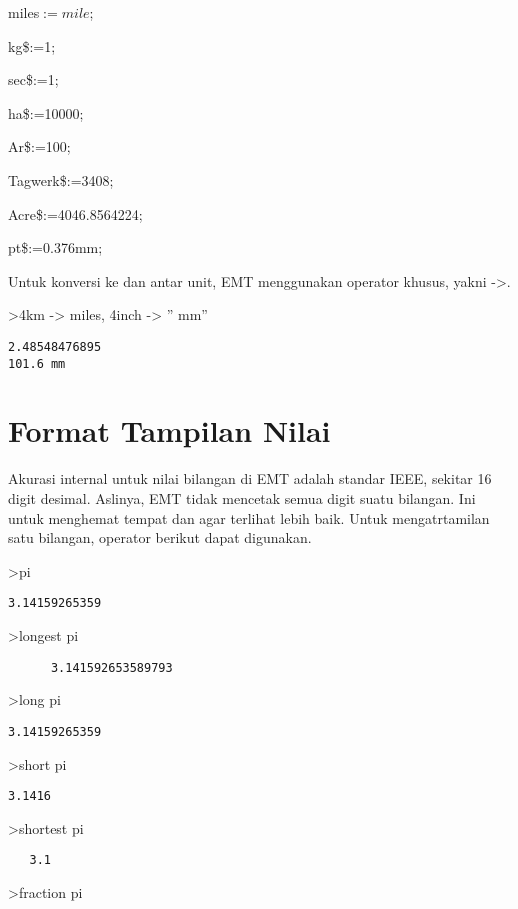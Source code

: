\documentclass[
]{book}
\begin{document}
miles\(:=mile\);

kg\$:=1;

sec\$:=1;

ha\$:=10000;

Ar\$:=100;

Tagwerk\$:=3408;

Acre\$:=4046.8564224;

pt\$:=0.376mm;

Untuk konversi ke dan antar unit, EMT menggunakan operator khusus, yakni -\textgreater.

\textgreater4km -\textgreater{} miles, 4inch -\textgreater{} '' mm''

\begin{verbatim}
2.48548476895
101.6 mm
\end{verbatim}

\chapter{Format Tampilan Nilai}\label{format-tampilan-nilai}

Akurasi internal untuk nilai bilangan di EMT adalah standar IEEE, sekitar 16 digit desimal. Aslinya, EMT tidak mencetak semua digit suatu bilangan. Ini untuk menghemat tempat dan agar terlihat lebih baik. Untuk mengatrtamilan satu bilangan, operator berikut dapat digunakan.

\textgreater pi

\begin{verbatim}
3.14159265359
\end{verbatim}

\textgreater longest pi

\begin{verbatim}
      3.141592653589793 
\end{verbatim}

\textgreater long pi

\begin{verbatim}
3.14159265359
\end{verbatim}

\textgreater short pi

\begin{verbatim}
3.1416
\end{verbatim}

\textgreater shortest pi

\begin{verbatim}
   3.1 
\end{verbatim}

\textgreater fraction pi
\end{document}
